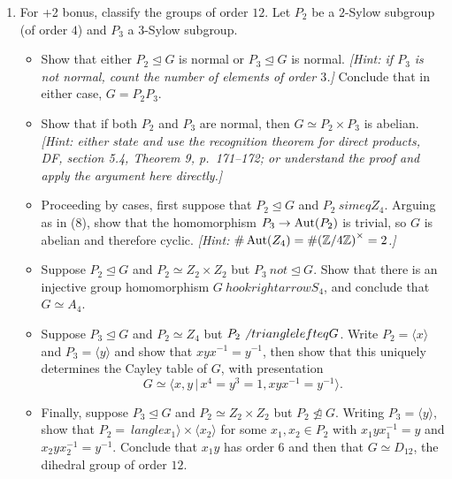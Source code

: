 \begin{Answer}
  \begin{enumerate}
  \item For +2 bonus, classify the groups of order $12$.  Let $P_2$ be a $2$-Sylow 
  subgroup (of order $4$) and $P_3$ a $3$-Sylow subgroup.  
  \begin{itemize}
  \item Show that either $P_2 \trianglelefteq G$ is normal or $P_3 \trianglelefteq G$
  is normal. 
  \emph{[Hint: if $P_3$ is not normal, count the number of elements of order $3$.]}  
  Conclude that in either case, $G=P_2P_3$.
  \item Show that if both $P_2$ and $P_3$ are normal, then $G \simeq P_2 \times P_3$ 
  is abelian.  \emph{[Hint: either state and use the recognition theorem for direct 
  products, DF, section 5.4, Theorem 9, p.~171--172; or understand the proof and 
  apply the argument here directly.]}
  \item Proceeding by cases, first suppose that $P_2 \trianglelefteq G$ and $P_2 \
  simeq Z_4$.  Arguing as in (8), show that the homomorphism $P_3 \to \operatorname{Aut}(P_2)$ is 
  trivial, so $G$ is abelian and therefore cyclic.  \emph{[Hint: 
  $\#\operatorname{Aut}(Z_4)=\#{(\mathbb{Z}/4\mathbb{Z})}^\times=2$.]}
  \item Suppose $P_2 \trianglelefteq G$ and $P_2 \simeq Z_2 \times Z_2$ but $P_3 \
  not\trianglelefteq G$.  Show that there is an injective group homomorphism $G \
  hookrightarrow S_4$, and conclude that $G \simeq A_4$.
  \item Suppose $P_3 \trianglelefteq G$ and $P_2 \simeq Z_4$ but $P_2 \not\
  trianglelefteq G$.  Write $P_2=\langle x \rangle$ and $P_3=\langle y \rangle$ and 
  show that $xyx^{-1}=y^{-1}$, then show that this uniquely determines the Cayley 
  table of $G$, with presentation
  \[ G \simeq \langle x,y \,|\, x^4=y^3=1, xyx^{-1}=y^{-1} \rangle. \]
  \item Finally, suppose $P_3 \trianglelefteq G$ and $P_2 \simeq Z_2 \times Z_2$ but 
  $P_2 \not\trianglelefteq G$.  Writing $P_3 = \langle y \rangle$, show that $P_2 = \
  langle x_1 \rangle \times \langle x_2 \rangle$ for some $x_1,x_2 \in P_2$ with 
  $x_1yx_1^{-1}=y$ and $x_2yx_2^{-1}=y^{-1}$.  Conclude that $x_1y$ has order $6$ and
  then that $G \simeq D_{12}$, the dihedral group of order $12$.   
  \end{itemize}
  \end{enumerate}
\end{Answer}
